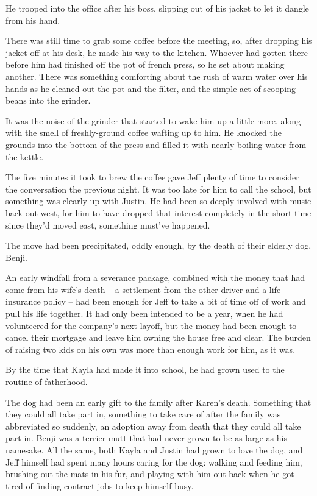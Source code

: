 He trooped into the office after his boss, slipping out of his jacket to let it dangle from his hand.

There was still time to grab some coffee before the meeting, so, after dropping his jacket off at his desk, he made his way to the kitchen.  Whoever had gotten there before him had finished off the pot of french press, so he set about making another.  There was something comforting about the rush of warm water over his hands as he cleaned out the pot and the filter, and the simple act of scooping beans into the grinder.

It was the noise of the grinder that started to wake him up a little more, along with the smell of freshly-ground coffee wafting up to him.  He knocked the grounds into the bottom of the press and filled it with nearly-boiling water from the kettle.

The five minutes it took to brew the coffee gave Jeff plenty of time to consider the conversation the previous night.  It was too late for him to call the school, but something was clearly up with Justin.  He had been so deeply involved with music back out west, for him to have dropped that interest completely in the short time since they'd moved east, something must've happened.

The move had been precipitated, oddly enough, by the death of their elderly dog, Benji.

An early windfall from a severance package, combined with the money that had come from his wife's death -- a settlement from the other driver and a life insurance policy -- had been enough for Jeff to take a bit of time off of work and pull his life together.  It had only been intended to be a year, when he had volunteered for the company's next layoff, but the money had been enough to cancel their mortgage and leave him owning the house free and clear.  The burden of raising two kids on his own was more than enough work for him, as it was.

By the time that Kayla had made it into school, he had grown used to the routine of fatherhood.

The dog had been an early gift to the family after Karen's death.  Something that they could all take part in, something to take care of after the family was abbreviated so suddenly, an adoption away from death that they could all take part in.  Benji was a terrier mutt that had never grown to be as large as his namesake.  All the same, both Kayla and Justin had grown to love the dog, and Jeff himself had spent many hours caring for the dog: walking and feeding him, brushing out the mats in his fur, and playing with him out back when he got tired of finding contract jobs to keep himself busy.

